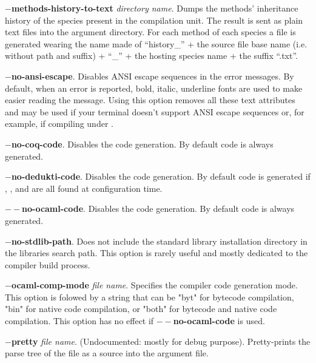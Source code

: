 \begin{compact-itemize}
 \item[*] {\bf $-$methods-history-to-text} {\em directory
   name}. Dumps the methods' inheritance history of the species
   present in the compilation unit. The result is sent as plain text files
   into the argument directory. For each method of each species a file
   is generated wearing the name made of ``history\_'' + the source
   file base name (i.e. without path and suffix) + ``\_'' + the
   hosting species name + the suffix ``.txt''.

  \item[*] {\bf $-$no-ansi-escape}. Disables ANSI escape sequences in
    the error messages. By default, when an error is reported, bold,
    italic, underline fonts are used to make easier reading the
    message. Using this option removes all these text attributes and
    may be used if your terminal doesn't support ANSI escape sequences
    or, for example, if compiling under \emacs.

  \item[*] {\bf $-$no-coq-code}. Disables the {\coq} code
    generation. By default {\coq} code is always generated.

  \item[*] {\bf $-$no-dedukti-code}. Disables the {\dedukti} code
    generation. By default {\dedukti} code is generated if {\dedukti},
    {\sukerujo}, and {\zmod} are all found at {\focal} configuration time.

  \item[*] {\bf $--$no-ocaml-code}. Disables the {\ocaml} code
    generation. By default {\ocaml} code is always generated.

   \item[*] {\bf $-$no-stdlib-path}. Does not include the standard
    library installation directory in the libraries search path. This
    option is rarely useful and mostly dedicated to the
    {\focal} compiler build process.

   \item[*] {\bf $-$ocaml-comp-mode} {\em file name}. Specifies the
     {\ocaml} compiler code generation mode. This option is folowed by
     a string that can be "byt" for bytecode compilation, "bin" for
     native code compilation, or "both" for bytecode and native code
     compilation. This option has no effect if {\bf $--$no-ocaml-code}
     is used.

  \item[*] {\bf $-$pretty} {\em file name}. (Undocumented: mostly for
    debug purpose). Pretty-prints the parse tree of the {\focal} file
    as a {\focal} source into the argument file.


\end{compact-itemize}
